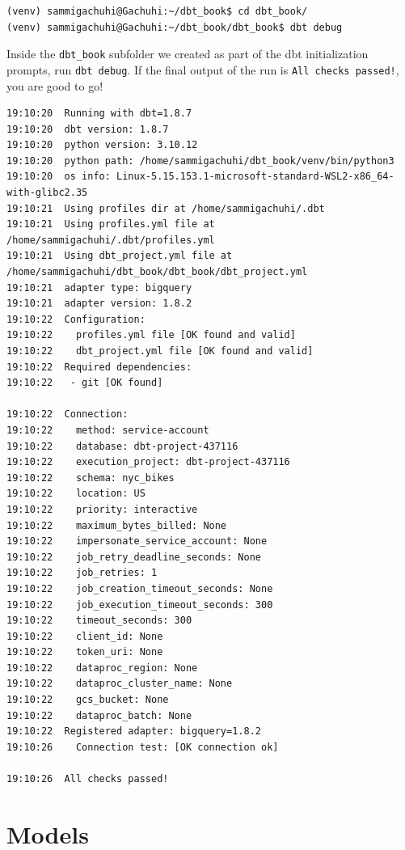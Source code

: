 \documentclass[
]{book}
\begin{document}
\begin{verbatim}
(venv) sammigachuhi@Gachuhi:~/dbt_book$ cd dbt_book/
(venv) sammigachuhi@Gachuhi:~/dbt_book/dbt_book$ dbt debug
\end{verbatim}

Inside the \texttt{dbt\_book} subfolder we created as part of the dbt initialization prompts, run \texttt{dbt\ debug}. If the final output of the run is \texttt{All\ checks\ passed!}, you are good to go!

\begin{verbatim}
19:10:20  Running with dbt=1.8.7
19:10:20  dbt version: 1.8.7
19:10:20  python version: 3.10.12
19:10:20  python path: /home/sammigachuhi/dbt_book/venv/bin/python3
19:10:20  os info: Linux-5.15.153.1-microsoft-standard-WSL2-x86_64-with-glibc2.35
19:10:21  Using profiles dir at /home/sammigachuhi/.dbt
19:10:21  Using profiles.yml file at /home/sammigachuhi/.dbt/profiles.yml
19:10:21  Using dbt_project.yml file at /home/sammigachuhi/dbt_book/dbt_book/dbt_project.yml
19:10:21  adapter type: bigquery
19:10:21  adapter version: 1.8.2
19:10:22  Configuration:
19:10:22    profiles.yml file [OK found and valid]
19:10:22    dbt_project.yml file [OK found and valid]
19:10:22  Required dependencies:
19:10:22   - git [OK found]

19:10:22  Connection:
19:10:22    method: service-account
19:10:22    database: dbt-project-437116
19:10:22    execution_project: dbt-project-437116
19:10:22    schema: nyc_bikes
19:10:22    location: US
19:10:22    priority: interactive
19:10:22    maximum_bytes_billed: None
19:10:22    impersonate_service_account: None
19:10:22    job_retry_deadline_seconds: None
19:10:22    job_retries: 1
19:10:22    job_creation_timeout_seconds: None
19:10:22    job_execution_timeout_seconds: 300
19:10:22    timeout_seconds: 300
19:10:22    client_id: None
19:10:22    token_uri: None
19:10:22    dataproc_region: None
19:10:22    dataproc_cluster_name: None
19:10:22    gcs_bucket: None
19:10:22    dataproc_batch: None
19:10:22  Registered adapter: bigquery=1.8.2
19:10:26    Connection test: [OK connection ok]

19:10:26  All checks passed!

\end{verbatim}

\hypertarget{models-1}{%
\chapter{Models}\label{models-1}}
\end{document}
